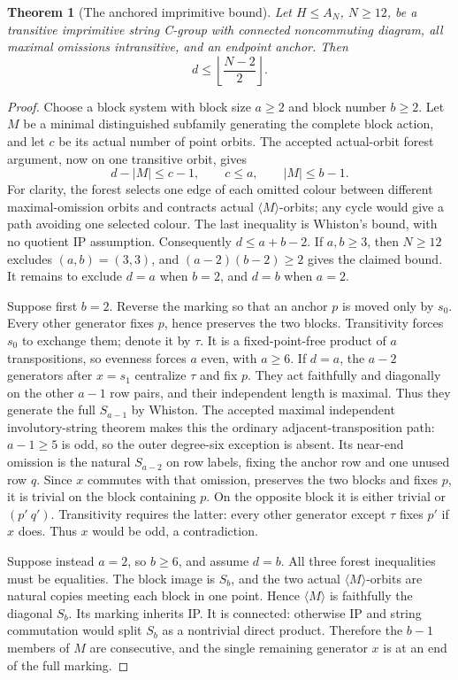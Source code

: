 \documentclass[11pt,a4paper]{article}
\newtheorem{theorem}{Theorem}
\newcommand{\gen}[1]{\langle#1\rangle}
\begin{document}
\begin{theorem}[The anchored imprimitive bound]
Let $H\leq A_N$, $N\geq12$, be a transitive imprimitive
string C-group with connected noncommuting diagram, all maximal
omissions intransitive, and an endpoint anchor. Then
\[
                         d\leq\left\lfloor\frac{N-2}{2}\right\rfloor.
\]
\end{theorem}
\begin{proof}
Choose a block system with block size $a\geq2$ and block
number $b\geq2$. Let $M$ be a minimal distinguished subfamily
generating the complete block action, and let $c$ be its actual
number of point orbits. The accepted actual-orbit forest
argument, now on one transitive orbit, gives
\[
       d-|M|\leq c-1,\qquad c\leq a,\qquad |M|\leq b-1.
\]
For clarity, the forest selects one edge of each omitted
colour between different maximal-omission orbits and contracts
actual $\gen M$-orbits; any cycle would give a path avoiding
one selected colour. The last inequality is Whiston's bound,
with no quotient IP assumption. Consequently $d\leq a+b-2$.
If $a,b\geq3$, then $N\geq12$ excludes $(a,b)=(3,3)$, and
$(a-2)(b-2)\geq2$ gives the claimed bound.
It remains to exclude $d=a$ when $b=2$, and $d=b$ when $a=2$.

Suppose first $b=2$. Reverse the marking so that an anchor $p$
is moved only by $s_0$. Every other generator fixes $p$, hence
preserves the two blocks. Transitivity forces $s_0$ to exchange
them; denote it by $\tau$. It is a fixed-point-free product of
$a$ transpositions, so evenness forces $a$ even, with $a\geq6$.
If $d=a$, the $a-2$ generators after $x=s_1$ centralize $\tau$
and fix $p$. They act faithfully and diagonally on the other
$a-1$ row pairs, and their independent length is maximal.
Thus they generate the full $S_{a-1}$ by Whiston.
The accepted maximal independent involutory-string theorem
makes this the ordinary adjacent-transposition path:
$a-1\geq5$ is odd, so the outer degree-six exception is absent.
Its near-end omission is the natural $S_{a-2}$ on row labels,
fixing the anchor row and one unused row $q$.
Since $x$ commutes with that omission, preserves the two
blocks and fixes $p$, it is trivial on the block containing
$p$. On the opposite block it is either trivial or
$(p'\ q')$. Transitivity requires the latter: every other
generator except $\tau$ fixes $p'$ if $x$ does.
Thus $x$ would be odd, a contradiction.

Suppose instead $a=2$, so $b\geq6$, and assume $d=b$.
All three forest inequalities must be equalities. The block
image is $S_b$, and the two actual $\gen M$-orbits are natural
copies meeting each block in one point. Hence $\gen M$ is
faithfully the diagonal $S_b$. Its marking inherits IP.
It is connected: otherwise IP and string commutation would
split $S_b$ as a nontrivial direct product. Therefore the
$b-1$ members of $M$ are consecutive, and the single remaining
generator $x$ is at an end of the full marking.


\end{proof}
\end{document}
